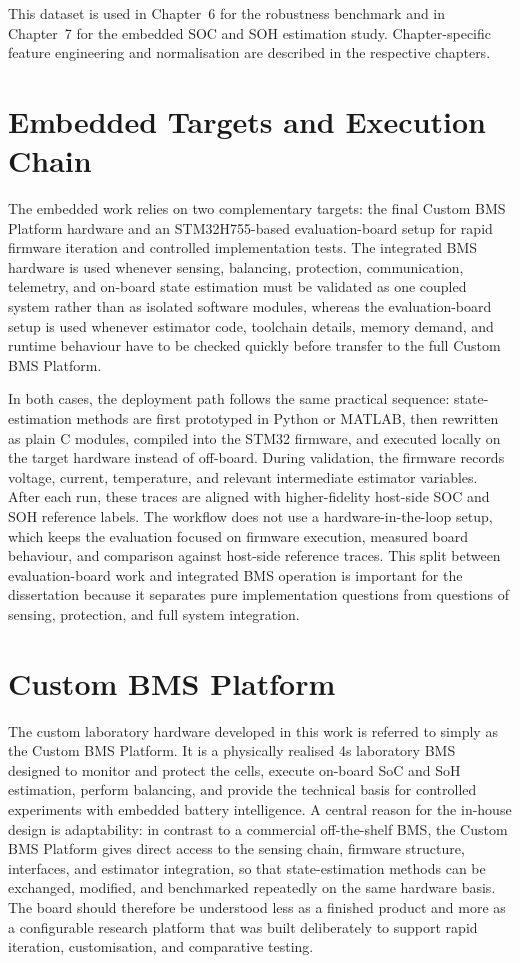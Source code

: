 \documentclass[
    a4paper,
    12pt,
    titlepage,
    bibliography=totoc,
    twoside=on,
    parskip=false,
    numbers=noenddot,
    cleardoublepage=empty,
    DIV=12,
    BCOR=12.0mm,
    headheight=36pt,
    headings=openright
]{scrreprt}
\begin{document}
This dataset is used in Chapter~6 for the robustness benchmark and in Chapter~7 for the embedded SOC and SOH estimation study. Chapter-specific feature engineering and normalisation are described in the respective chapters.

\section{Embedded Targets and Execution Chain}
The embedded work relies on two complementary targets: the final Custom BMS Platform hardware and an STM32H755-based evaluation-board setup for rapid firmware iteration and controlled implementation tests. The integrated BMS hardware is used whenever sensing, balancing, protection, communication, telemetry, and on-board state estimation must be validated as one coupled system rather than as isolated software modules, whereas the evaluation-board setup is used whenever estimator code, toolchain details, memory demand, and runtime behaviour have to be checked quickly before transfer to the full Custom BMS Platform.

In both cases, the deployment path follows the same practical sequence: state-estimation methods are first prototyped in Python or MATLAB, then rewritten as plain C modules, compiled into the STM32 firmware, and executed locally on the target hardware instead of off-board. During validation, the firmware records voltage, current, temperature, and relevant intermediate estimator variables. After each run, these traces are aligned with higher-fidelity host-side SOC and SOH reference labels. The workflow does not use a hardware-in-the-loop setup, which keeps the evaluation focused on firmware execution, measured board behaviour, and comparison against host-side reference traces. This split between evaluation-board work and integrated BMS operation is important for the dissertation because it separates pure implementation questions from questions of sensing, protection, and full system integration.

\section{Custom BMS Platform}
The custom laboratory hardware developed in this work is referred to simply as the Custom BMS Platform. It is a physically realised 4s laboratory BMS designed to monitor and protect the cells, execute on-board SoC and SoH estimation, perform balancing, and provide the technical basis for controlled experiments with embedded battery intelligence. A central reason for the in-house design is adaptability: in contrast to a commercial off-the-shelf BMS, the Custom BMS Platform gives direct access to the sensing chain, firmware structure, interfaces, and estimator integration, so that state-estimation methods can be exchanged, modified, and benchmarked repeatedly on the same hardware basis. The board should therefore be understood less as a finished product and more as a configurable research platform that was built deliberately to support rapid iteration, customisation, and comparative testing.
\end{document}
